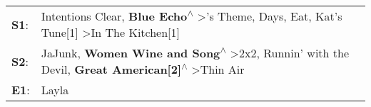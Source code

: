 \begin{supertabular}{p{0.03\textwidth}p{0.92\textwidth}}
 \textbf{S1}:  &  Intentions Clear\textsuperscript{}, \enspace \textbf{Blue Echo\textsuperscript{$\wedge$}} \textgreater {}'s Theme\textsuperscript{},  Days\textsuperscript{}, \enspace Eat\textsuperscript{}, \enspace Kat's Tune[1]\textsuperscript{} \textgreater \enspace In The Kitchen[1]\textsuperscript{}  \enspace  \\
 \textbf{S2}:  &              JaJunk\textsuperscript{}, \enspace \textbf{Women Wine and Song\textsuperscript{$\wedge$}} \textgreater \enspace 2x2\textsuperscript{}, \enspace Runnin' with the Devil\textsuperscript{}, \enspace \textbf{Great American[2]\textsuperscript{$\wedge$}} \textgreater \enspace Thin Air\textsuperscript{}  \enspace  \\
 \textbf{E1}:  &                                                                                                                                                                                                                                                                                               Layla\textsuperscript{}  \enspace  \\
\end{supertabular}
